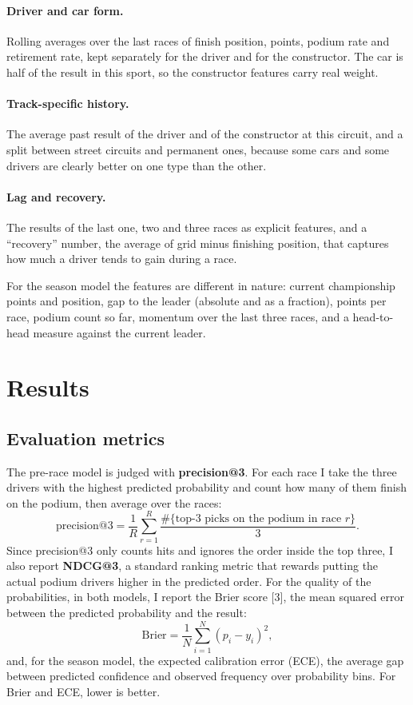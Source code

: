 \documentclass[10pt,twocolumn]{article}
\begin{document}
\paragraph{Driver and car form.} Rolling averages over the last races of finish
position, points, podium rate and retirement rate, kept separately for the
driver and for the constructor. The car is half of the result in this sport, so
the constructor features carry real weight.

\paragraph{Track-specific history.} The average past result of the driver and of
the constructor at this circuit, and a split between street circuits and
permanent ones, because some cars and some drivers are clearly better on one
type than the other.

\paragraph{Lag and recovery.} The results of the last one, two and three races
as explicit features, and a ``recovery'' number, the average of grid minus
finishing position, that captures how much a driver tends to gain during a race.

For the season model the features are different in nature: current championship
points and position, gap to the leader (absolute and as a fraction), points per
race, podium count so far, momentum over the last three races, and a head-to-head
measure against the current leader.

\section{Results}

\subsection{Evaluation metrics}
The pre-race model is judged with \textbf{precision@3}. For each race I take the
three drivers with the highest predicted probability and count how many of them
finish on the podium, then average over the races:
\begin{equation}
  \text{precision@3} = \frac{1}{R}\sum_{r=1}^{R}
       \frac{\#\{\text{top-3 picks on the podium in race } r\}}{3}.
\end{equation}
Since precision@3 only counts hits and ignores the order inside the top three, I
also report \textbf{NDCG@3}, a standard ranking metric that rewards putting the
actual podium drivers higher in the predicted order. For the quality of the
probabilities, in both models, I report the Brier score
[3], the mean squared error between the predicted probability and the result:
\begin{equation}
  \text{Brier} = \frac{1}{N}\sum_{i=1}^{N} (p_i - y_i)^2 ,
\end{equation}
and, for the season model, the expected calibration error (ECE), the average gap
between predicted confidence and observed frequency over probability bins. For
Brier and ECE, lower is better.
\end{document}
